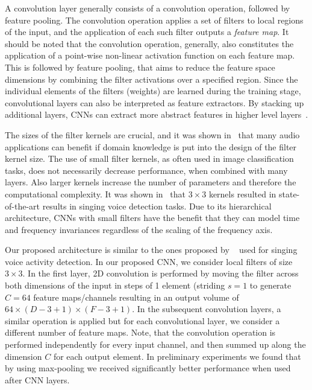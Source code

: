 A convolution layer generally consists of a convolution operation, followed by feature pooling.
The convolution operation applies a set of filters to local regions of the input, and the application of each such filter outputs a \emph{feature map}.
It should be noted that the convolution operation, generally, also constitutes the application of a point-wise non-linear activation function on each feature map.
This is followed by feature pooling, that aims to reduce the feature space dimensions by combining the filter activations over a specified region.
Since the individual elements of the filters (weights) are learned during the training stage, convolutional layers can also be interpreted as feature extractors.
By stacking up additional layers, CNNs can extract more abstract features in higher level layers~\cite{Simonyan15}.
\par
The sizes of the filter kernels are crucial, and it was shown in~\cite{pons2017timbre} that many audio applications can benefit if domain knowledge is put into the design of the filter kernel size.
The use of small filter kernels, as often used in image classification tasks, does not necessarily decrease performance, when combined with many layers.
Also larger kernels increase the number of parameters and therefore the computational complexity.
It was shown in~\cite{schluter15} that \(3 \times 3\) kernels resulted in state-of-the-art results in singing voice detection tasks.
Due to its hierarchical architecture, CNNs with small filters have the benefit that they can model time and frequency invariances regardless of the scaling of the frequency axis.
\par
Our proposed architecture is similar to the ones proposed by ~\cite{schluter16} used for singing voice activity detection.
In our proposed CNN, we consider local filters of size \(3 \times 3\). In the first layer, 2D convolution is performed by moving the filter across both dimensions of the input in steps of 1 element (striding \(s = 1\) to generate \(C = 64\) feature maps/channels resulting in an output volume of \(64 \times (D - 3 + 1) \times (F - 3 + 1)\).
In the subsequent convolution layers, a similar operation is applied but for each convolutional layer, we consider a different number of feature maps.
Note, that the convolution operation is performed independently for every input channel, and then summed up along the dimension \(C\) for each output element.
In preliminary experiments we found that by using max-pooling we received significantly better performance when used after CNN layers.

